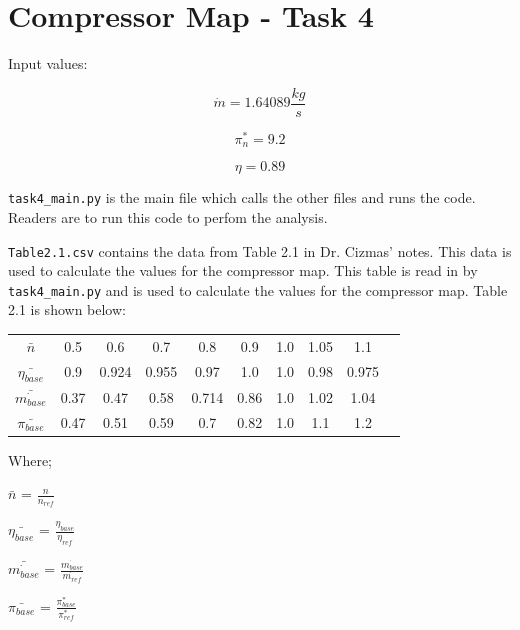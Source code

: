 \documentclass[titlepage]{article}
\begin{document}
\section{Compressor Map - Task 4}

Input values:

\begin{equation}
    \dot{m} = 1.64089 \frac{kg}{s} 
\end{equation}

\begin{equation}
    \pi^{*}_{n} = 9.2
\end{equation}

\begin{equation}
    \eta = 0.89 
\end{equation}

\verb|task4_main.py| is the main file which calls the other files and runs the code. Readers are to run this code to perfom the analysis.

\vspace*{3pt}

\verb|Table2.1.csv| contains the data from Table 2.1 in Dr. Cizmas' notes. This data is used to calculate the values for the compressor map. This table is read in by \verb|task4_main.py| and is used to calculate the values for the compressor map. Table 2.1 is shown below:

\begin{center}
    \begin{tabular}{ c c c c c c c c c c }
     $\bar{n}$ & 0.5 & 0.6 & 0.7 & 0.8 & 0.9 & 1.0 & 1.05 & 1.1 \\ 
        $\bar{\eta_{base}}$ & 0.9 & 0.924 & 0.955 & 0.97 & 1.0 & 1.0 & 0.98 & 0.975 \\
        $\bar{\dot{m_{base}}}$ & 0.37 & 0.47 & 0.58 & 0.714 & 0.86 & 1.0 & 1.02 & 1.04 \\
        $\bar{\pi_{base}}$ & 0.47 & 0.51 & 0.59 & 0.7 & 0.82 & 1.0 & 1.1 & 1.2 \\
    \end{tabular}
    \end{center}

\vspace*{3pt}

Where; 
\begin{center}
    $\bar{n}$ = $\frac{n}{n_{ref}}$ 

    \vspace*{3pt}

    $\bar{\eta_{base}}$ = $\frac{\eta_{base}}{\eta_{ref}}$
    
    \vspace*{3pt}
    
    $\bar{\dot{m_{base}}}$ = $\frac{\dot{m_{base}}}{\dot{m_{ref}}}$
    
    \vspace*{3pt}
    
    $\bar{\pi_{base}}$ = $\frac{\pi^* _{base}}{\pi^* _{ref}}$
\end{center}
\end{document}
